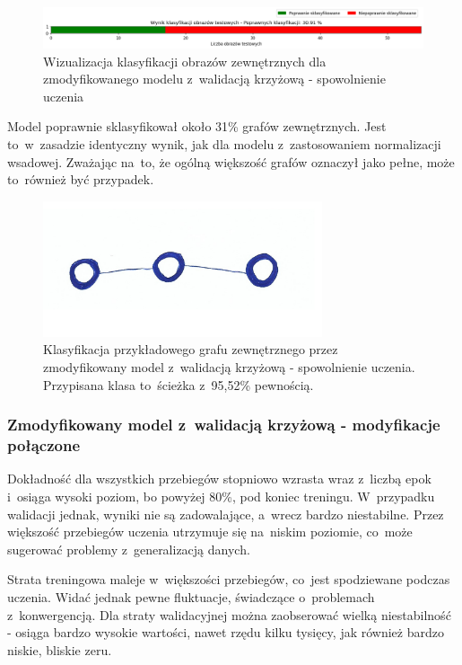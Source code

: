 \begin{figure}[ht]
	\centering
	\includegraphics[width=15.5cm]{resources/tests/images/v4/crossvalid_4_bar.png}
	\caption{Wizualizacja klasyfikacji obrazów zewnętrznych dla zmodyfikowanego modelu z~walidacją krzyżową - spowolnienie uczenia}
	\label{Fig:tests-cv-4c}
\end{figure}
\FloatBarrier

Model poprawnie sklasyfikował około 31\% grafów zewnętrznych.
Jest to~w~zasadzie identyczny wynik, jak dla modelu z~zastosowaniem normalizacji wsadowej.
Zważając na~to, że ogólną większość grafów oznaczył jako pełne, może to~również być przypadek.

\begin{figure}[ht]
	\centering
	\includegraphics[height=4cm]{../graph_classification/test_graphs/drawn/path-10.png}
	\caption{Klasyfikacja przykładowego grafu zewnętrznego przez zmodyfikowany model z~walidacją krzyżową - spowolnienie uczenia.
		Przypisana klasa to~ścieżka z~95,52\% pewnością.}
	\label{Fig:tests-cv-4d}
\end{figure}
\FloatBarrier

\subsubsection{Zmodyfikowany model z~walidacją krzyżową - modyfikacje połączone}

Dokładność dla wszystkich przebiegów stopniowo wzrasta wraz z~liczbą epok
i~osiąga wysoki poziom, bo powyżej 80\%, pod koniec treningu.
W~przypadku walidacji jednak, wyniki nie są zadowalające, a~wrecz bardzo niestabilne.
Przez większość przebiegów uczenia utrzymuje się na~niskim poziomie,
co~może sugerować problemy z~generalizacją danych.

Strata treningowa maleje w~większości przebiegów, co~jest spodziewane podczas uczenia.
Widać jednak pewne fluktuacje, świadczące o~problemach z~konwergencją.
Dla straty walidacyjnej można zaobserować wielką niestabilność - osiąga bardzo wysokie wartości,
nawet rzędu kilku tysięcy, jak również bardzo niskie, bliskie zeru.

